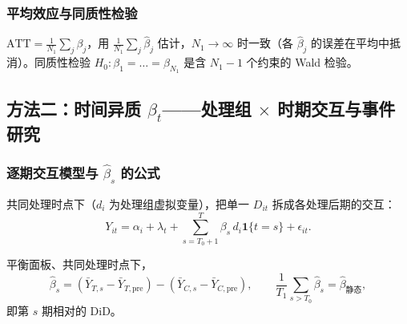 \subsubsection{平均效应与同质性检验}

$\text{ATT}=\frac1{N_1}\sum_j\beta_j$，用 $\frac1{N_1}\sum_j\hat\beta_j$ 估计，$N_1\to\infty$ 时一致（各 $\hat\beta_j$ 的误差在平均中抵消）。同质性检验 $H_0:\beta_1=\dots=\beta_{N_1}$ 是含 $N_1-1$ 个约束的 Wald 检验。

\subsection{方法二：时间异质 \texorpdfstring{$\beta_t$}{beta\_t}——处理组 \texorpdfstring{$\times$}{x} 时期交互与事件研究}\label{sec:U17b-m2}

\subsubsection{逐期交互模型与 \texorpdfstring{$\hat\beta_s$}{beta\_s hat} 的公式}

共同处理时点下（$d_i$ 为处理组虚拟变量），把单一 $D_{it}$ 拆成各处理后期的交互：
\begin{equation}\label{eq:U17b-m2}
Y_{it}=\alpha_i+\lambda_t+\sum_{s=T_0+1}^{T}\beta_s\,d_i\mathbf{1}\{t=s\}+\epsilon_{it}.
\end{equation}

\begin{thm}\label{thm:U17b-m2}
平衡面板、共同处理时点下，
\[
\hat\beta_s=(\bar Y_{T,s}-\bar Y_{T,\mathrm{pre}})-(\bar Y_{C,s}-\bar Y_{C,\mathrm{pre}}),\qquad \frac1{T_1}\sum_{s>T_0}\hat\beta_s=\hat\beta_{\text{静态}},
\]
即第 $s$ 期相对的 DiD。
\end{thm}

